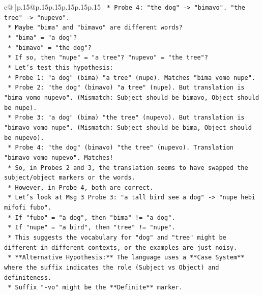 \documentclass{article}
\begin{document}
{\begin{supertabular}{c@{$\;$}|p{.15\linewidth}@{}p{.15\linewidth}p{.15\linewidth}p{.15\linewidth}p{.15\linewidth}p{.15\linewidth}}
{{{\texttt{                    *   Probe 4: "the dog" {-}> "bimavo". "the tree" {-}> "nupevo".} \\
\texttt{                *   Maybe "bima" and "bimavo" are different words?} \\
\texttt{                    *   "bima" = "a dog"?} \\
\texttt{                    *   "bimavo" = "the dog"?} \\
\texttt{                    *   If so, then "nupe" = "a tree"? "nupevo" = "the tree"?} \\
\texttt{                    *   Let's test this hypothesis:} \\
\texttt{                        *   Probe 1: "a dog" (bima) "a tree" (nupe). Matches "bima vomo nupe".} \\
\texttt{                        *   Probe 2: "the dog" (bimavo) "a tree" (nupe). But translation is "bima vomo nupevo". (Mismatch: Subject should be bimavo, Object should be nupe).} \\
\texttt{                        *   Probe 3: "a dog" (bima) "the tree" (nupevo). But translation is "bimavo vomo nupe". (Mismatch: Subject should be bima, Object should be nupevo).} \\
\texttt{                        *   Probe 4: "the dog" (bimavo) "the tree" (nupevo). Translation "bimavo vomo nupevo". Matches!} \\
\texttt{                *   So, in Probes 2 and 3, the translation seems to have swapped the subject/object markers or the words.} \\
\texttt{                *   However, in Probe 4, both are correct.} \\
\texttt{                *   Let's look at Msg 3 Probe 3: "a tall bird see a dog" {-}> "nupe hebi mifofi fubo".} \\
\texttt{                    *   If "fubo" = "a dog", then "bima" != "a dog".} \\
\texttt{                    *   If "nupe" = "a bird", then "tree" != "nupe".} \\
\texttt{                    *   This suggests the vocabulary for "dog" and "tree" might be different in different contexts, or the examples are just noisy.} \\
\texttt{    *   **Alternative Hypothesis:** The language uses a **Case System** where the suffix indicates the role (Subject vs Object) and definiteness.} \\
\texttt{        *   Suffix "{-}vo" might be the **Definite** marker.} \\
}}}
\end{supertabular}}
\end{document}
